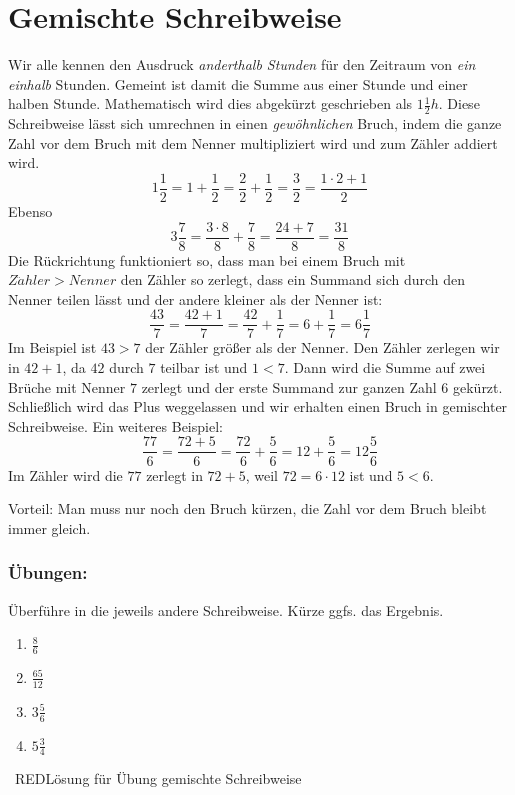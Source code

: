 \section{Gemischte Schreibweise}\vspace{-1em}
Wir alle kennen den Ausdruck \emph{anderthalb Stunden} für den Zeitraum von \emph{ein einhalb} Stunden. Gemeint ist damit die Summe aus einer Stunde und einer halben Stunde. Mathematisch wird dies abgekürzt geschrieben als $1\frac{1}{2}h$. Diese Schreibweise lässt sich umrechnen in einen \emph{gewöhnlichen} Bruch, indem die ganze Zahl vor dem Bruch mit dem Nenner multipliziert wird und zum Zähler addiert wird.
\begin{equation*}
	1\frac{1}{2}= 1+\frac{1}{2} = \frac{2}{2}+\frac{1}{2}=\frac{3}{2}=\frac{1\cdot 2+1}{2}
\end{equation*}
Ebenso
\begin{equation*}
	3\frac{7}{8}= \frac{3\cdot 8}{8}+\frac{7}{8}=\frac{24+7}{8}= \frac{31}{8}
\end{equation*}
Die Rückrichtung funktioniert so, dass man bei einem Bruch mit $Z\ddot{a}hler>Nenner$ den Zähler so zerlegt, dass ein Summand sich durch den Nenner teilen lässt und der andere kleiner als der Nenner ist:
\begin{equation*}
	\frac{43}{7}=\frac{42+1}{7}=\frac{42}{7}+\frac{1}{7}=6+\frac{1}{7}=6\frac{1}{7}
\end{equation*}
Im Beispiel ist $43>7$ der Zähler größer als der Nenner. Den Zähler zerlegen wir in $42+1$, da $42$ durch $7$ teilbar ist und $1<7$. Dann wird die Summe auf zwei Brüche mit Nenner $7$ zerlegt und der erste Summand zur ganzen Zahl $6$ gekürzt. Schließlich wird das Plus weggelassen und wir erhalten einen Bruch in gemischter Schreibweise.
Ein weiteres Beispiel:
\begin{equation*}
	\frac{77}{6}=\frac{72+5}{6}=\frac{72}{6}+\frac{5}{6}=12+\frac{5}{6}=12\frac{5}{6}
\end{equation*}
Im Zähler wird die $77$ zerlegt in $72+5$, weil $72=6\cdot12$ ist und $5<6$.

Vorteil: Man muss nur noch den Bruch kürzen, die Zahl vor dem Bruch bleibt immer gleich.

\subsubsection*{Übungen:}\vspace{-1em}
Überführe in die jeweils andere Schreibweise. Kürze ggfs. das Ergebnis.
\begin{multicols}{2}
	\begin{enumerate}[label=\alph*)]
		\item $\frac{8}{6}$
		\item $\frac{65}{12}$
		\item $3\frac{5}{6}$
		\item $5\frac{3}{4}$
	\end{enumerate}
\end{multicols}
\ RED{Lösung für Übung gemischte Schreibweise}